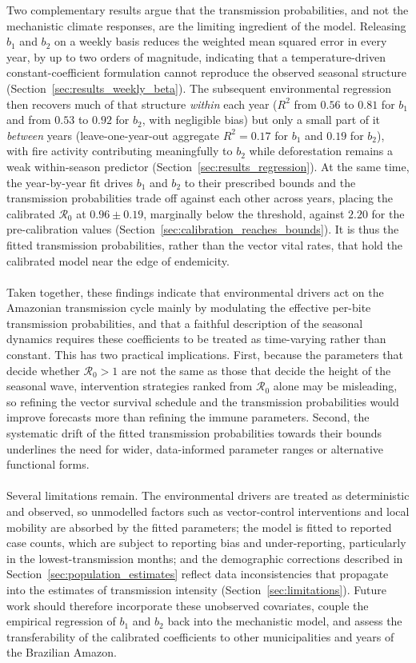 \documentclass[a4paper,fleqn]{cas-dc}
\begin{document}
Two complementary results argue that the transmission probabilities, and not the mechanistic
climate responses, are the limiting ingredient of the model. Releasing $b_1$ and $b_2$ on a
weekly basis reduces the weighted mean squared error in every year, by up to two orders of
magnitude, indicating that a temperature-driven constant-coefficient formulation cannot
reproduce the observed seasonal structure (Section~\ref{sec:results_weekly_beta}). The
subsequent environmental regression then recovers much of that structure \emph{within} each
year ($R^2$ from $0.56$ to $0.81$ for $b_1$ and from $0.53$ to $0.92$ for $b_2$, with
negligible bias) but only a small part of it \emph{between} years (leave-one-year-out aggregate
$R^2 = 0.17$ for $b_1$ and $0.19$ for $b_2$), with fire
activity contributing meaningfully to $b_2$ while deforestation remains a weak
within-season predictor (Section~\ref{sec:results_regression}). At the same time, the
year-by-year fit drives $b_1$ and $b_2$ to their prescribed bounds and the transmission
probabilities trade off against each other across years, placing the calibrated
$\mathcal{R}_0$ at $0.96\pm0.19$, marginally below the threshold, against $2.20$ for the
pre-calibration values (Section~\ref{sec:calibration_reaches_bounds}). It is thus the fitted
transmission probabilities, rather than the vector vital rates, that hold the calibrated
model near the edge of endemicity.
\\\\
Taken together, these findings indicate that environmental drivers act on the Amazonian
transmission cycle mainly by modulating the effective per-bite transmission probabilities,
and that a faithful description of the seasonal dynamics requires these coefficients to be
treated as time-varying rather than constant. This has two practical implications. First,
because the parameters that decide whether $\mathcal{R}_0>1$ are not the same as those that
decide the height of the seasonal wave, intervention strategies ranked from $\mathcal{R}_0$
alone may be misleading, so refining the vector survival schedule and the transmission
probabilities would improve forecasts more than refining the immune parameters. Second, the
systematic drift of the fitted transmission probabilities towards their bounds underlines the
need for wider, data-informed parameter ranges or alternative functional forms.
\\\\
Several limitations remain. The environmental drivers are treated as deterministic and
observed, so unmodelled factors such as vector-control interventions and local mobility are
absorbed by the fitted parameters; the model is fitted to reported case counts, which are
subject to reporting bias and under-reporting, particularly in the lowest-transmission
months; and the demographic corrections described in Section~\ref{sec:population_estimates}
reflect data inconsistencies that propagate into the estimates of transmission intensity
(Section~\ref{sec:limitations}). Future work should therefore incorporate these unobserved
covariates, couple the empirical regression of $b_1$ and $b_2$ back into the mechanistic
model, and assess the transferability of the calibrated coefficients to other municipalities
and years of the Brazilian Amazon.
\end{document}
